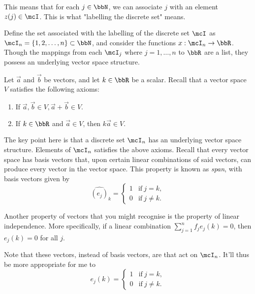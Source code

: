 \documentclass[a4paper, 12pt,oneside,openany]{book}
\begin{document}

This means that for each $j\in \bbN$, we can associate $j$ with an element $z(j) \in \mcI$. This is what "labelling the discrete set" means.


Define the set associated with the labelling of the discrete set $\mcI$ as $\mcI_n = \{1, 2, \dots, n\} \subset \bbN$, and consider the functions $x: \mcI_n \to \bbR$. Though the mappings from each $\mcI_j$ where $j=1, \dots, n$ to $\bbR$ are a list, they possess an underlying vector space structure. 

Let $\vec{a}$ and $\vec{b}$ be vectors, and let $k \in \bbR$ be a scalar. Recall that a vector space $V$ satisfies the following axioms:

\begin{enumerate}
	\item If $\vec{a}, \vec{b} \in V, \vec{a}+\vec{b} \in V.$
	\item If $k\in \bbR$ and $\vec{a} \in V$, then $k\vec{a} \in V$.
\end{enumerate}

The key point here is that a discrete set $\mcI_n$ has an underlying vector space structure. Elements of $\mcI_n$ satisfies the above axioms. Recall that every vector space has basis vectors that, upon certain linear combinations of said vectors, can produce every vector in the vector space. This property is known as \emph{span}, with basis vectors given by $$\hat{(e_j)}_k = \begin{cases}1 & \text{if}\ j=k, \\ 0 & \text{if}\ j \neq k. \end{cases}$$ 

Another property of vectors that you might recognise is the property of linear independence. More specifically, if a linear combination $\sum\limits_{j=1}^n f_j e_j(k)=0$, then $e_j(k)=0$ for all $j$. 

Note that these vectors, instead of basis vectors, are  that act on $\mcI_n$. It'll thus be more appropriate for me to $$e_j(k) = \begin{cases}1 & \text{if}\ j=k, \\ 0 & \text{if}\ j \neq k. \end{cases}$$
\end{document}
